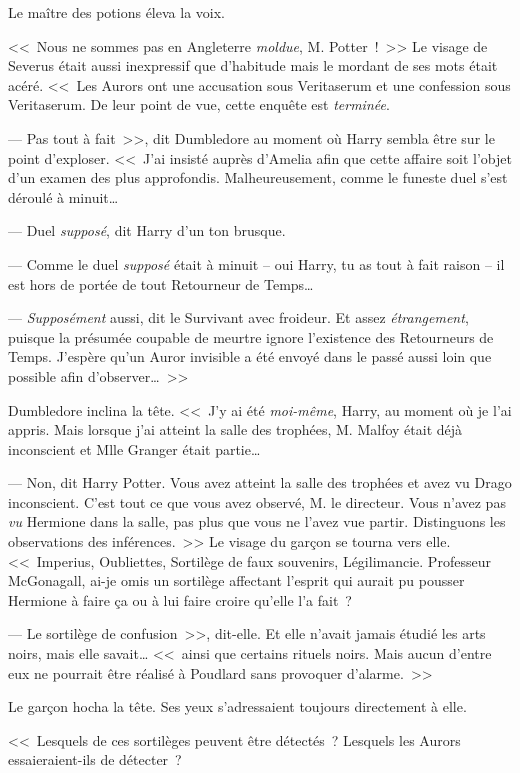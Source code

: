 Le maître des potions éleva la voix.

<<~Nous ne sommes pas en Angleterre \emph{moldue}, M. Potter~!~>> Le visage de Severus était aussi inexpressif que d'habitude mais le mordant de ses mots était acéré. <<~Les Aurors ont une accusation sous Veritaserum et une confession sous Veritaserum. De leur point de vue, cette enquête est \emph{terminée}.

--- Pas tout à fait~>>, dit Dumbledore au moment où Harry sembla être sur le point d'exploser. <<~J'ai insisté auprès d'Amelia afin que cette affaire soit l'objet d'un examen des plus approfondis. Malheureusement, comme le funeste duel s'est déroulé à minuit…

--- Duel \emph{supposé}, dit Harry d'un ton brusque.

--- Comme le duel \emph{supposé} était à minuit -- oui Harry, tu as tout à fait raison -- il est hors de portée de tout Retourneur de Temps…

--- \emph{Supposément} aussi, dit le Survivant avec froideur. Et assez \emph{étrangement}, puisque la présumée coupable de meurtre ignore l'existence des Retourneurs de Temps. J'espère qu'un Auror invisible a été envoyé dans le passé aussi loin que possible afin d'observer…~>>

Dumbledore inclina la tête. <<~J'y ai été \emph{moi-même}, Harry, au moment où je l'ai appris. Mais lorsque j'ai atteint la salle des trophées, M. Malfoy était déjà inconscient et Mlle Granger était partie…

--- Non, dit Harry Potter. Vous avez atteint la salle des trophées et avez vu Drago inconscient. C'est tout ce que vous avez observé, M. le directeur. Vous n'avez pas \emph{vu} Hermione dans la salle, pas plus que vous ne l'avez vue partir. Distinguons les observations des inférences.~>> Le visage du garçon se tourna vers elle. <<~Imperius, Oubliettes, Sortilège de faux souvenirs, Légilimancie. Professeur McGonagall, ai-je omis un sortilège affectant l'esprit qui aurait pu pousser Hermione à faire ça ou à lui faire croire qu'elle l'a fait~?

--- Le sortilège de confusion~>>, dit-elle. Et elle n'avait jamais étudié les arts noirs, mais elle savait… <<~ainsi que certains rituels noirs. Mais aucun d'entre eux ne pourrait être réalisé à Poudlard sans provoquer d'alarme.~>>

Le garçon hocha la tête. Ses yeux s'adressaient toujours directement à elle.

<<~Lesquels de ces sortilèges peuvent être détectés~? Lesquels les Aurors essaieraient-ils de détecter~?

